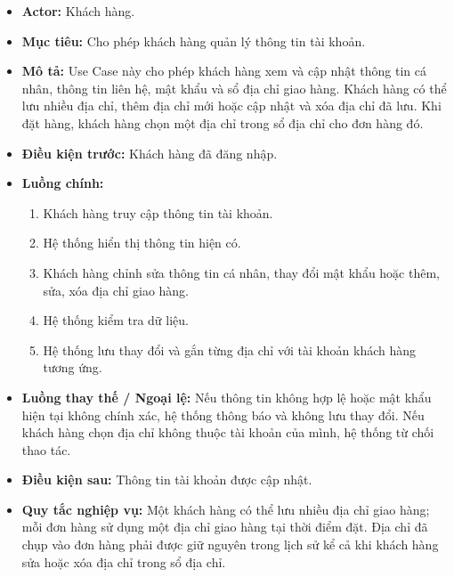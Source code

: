 \documentclass[12pt,a4paper]{article}
\begin{document}
\begin{itemize}

 \item \textbf{Actor:} Khách hàng.

 \item \textbf{Mục tiêu:} Cho phép khách hàng quản lý thông tin tài khoản.

 \item \textbf{Mô tả:} Use Case này cho phép khách hàng xem và cập nhật thông tin cá nhân, thông tin liên hệ, mật khẩu và sổ địa chỉ giao hàng. Khách hàng có thể lưu nhiều địa chỉ, thêm địa chỉ mới hoặc cập nhật và xóa địa chỉ đã lưu. Khi đặt hàng, khách hàng chọn một địa chỉ trong sổ địa chỉ cho đơn hàng đó.

 \item \textbf{Điều kiện trước:} Khách hàng đã đăng nhập.

 \item \textbf{Luồng chính:}

 \begin{enumerate}

  \item Khách hàng truy cập thông tin tài khoản.

  \item Hệ thống hiển thị thông tin hiện có.

   \item Khách hàng chỉnh sửa thông tin cá nhân, thay đổi mật khẩu hoặc thêm, sửa, xóa địa chỉ giao hàng.

  \item Hệ thống kiểm tra dữ liệu.

   \item Hệ thống lưu thay đổi và gắn từng địa chỉ với tài khoản khách hàng tương ứng.

 \end{enumerate}

  \item \textbf{Luồng thay thế / Ngoại lệ:} Nếu thông tin không hợp lệ hoặc mật khẩu hiện tại không chính xác, hệ thống thông báo và không lưu thay đổi. Nếu khách hàng chọn địa chỉ không thuộc tài khoản của mình, hệ thống từ chối thao tác.

 \item \textbf{Điều kiện sau:} Thông tin tài khoản được cập nhật.

  \item \textbf{Quy tắc nghiệp vụ:} Một khách hàng có thể lưu nhiều địa chỉ giao hàng; mỗi đơn hàng sử dụng một địa chỉ giao hàng tại thời điểm đặt. Địa chỉ đã chụp vào đơn hàng phải được giữ nguyên trong lịch sử kể cả khi khách hàng sửa hoặc xóa địa chỉ trong sổ địa chỉ.

\end{itemize}
\end{document}
